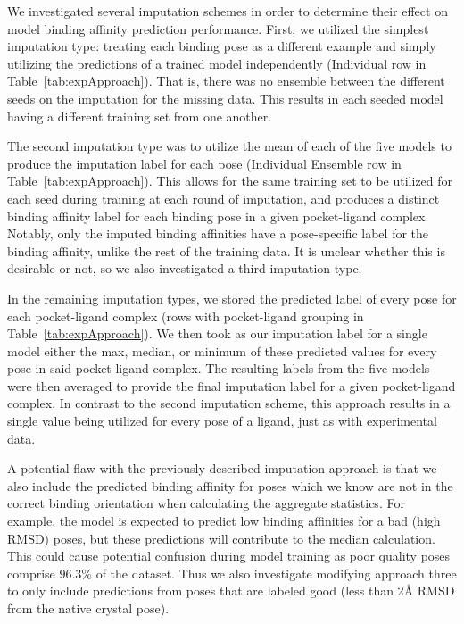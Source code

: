 \documentclass[journal=jcim,manuscript=article]{achemso}
\begin{document}
We investigated several imputation schemes in order to determine their effect on model binding affinity prediction performance.
First, we utilized the simplest imputation type: treating each binding pose as a different example and simply utilizing the predictions of a trained model independently (Individual row in Table~\ref{tab:expApproach}).
That is, there was no ensemble between the different seeds on the imputation for the missing data.
This results in each seeded model having a different training set from one another.

The second imputation type was to utilize the mean of each of the five models to produce the imputation label for each pose (Individual Ensemble row in Table~\ref{tab:expApproach}).
This allows for the same training set to be utilized for each seed during training at each round of imputation, and produces a distinct binding affinity label for each binding pose in a given pocket-ligand complex.
Notably, only the imputed binding affinities have a pose-specific label for the binding affinity, unlike the rest of the training data.
It is unclear whether this is desirable or not, so we also investigated a third imputation type.

In the remaining imputation types, we stored the predicted label of every pose for each pocket-ligand complex (rows with pocket-ligand grouping in Table~\ref{tab:expApproach}).
We then took as our imputation label for a single model either the max, median, or minimum of these predicted values for every pose in said pocket-ligand complex.
The resulting labels from the five models were then averaged to provide the final imputation label for a given pocket-ligand complex.
In contrast to the second imputation scheme, this approach results in a single value being utilized for every pose of a ligand, just as with experimental data.

A potential flaw with the previously described imputation approach is that we also include the predicted binding affinity for poses which we know are not in the correct binding orientation when calculating the aggregate statistics.
For example, the model is expected to predict low binding affinities for a bad (high RMSD) poses, but these predictions will contribute to the median calculation.
This could cause potential confusion during model training as poor quality poses  comprise 96.3\% of the dataset.
Thus we also investigate modifying approach three to only include predictions from poses that are labeled good (less than 2{\AA} RMSD from the native crystal pose).
\end{document}

